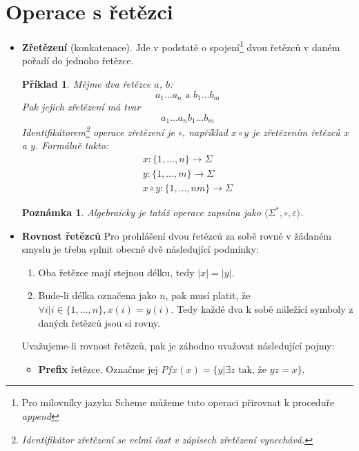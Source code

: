 \documentclass[10pt, a4paper, titlepage]{article}
\theoremstyle{note}
\newtheorem{priklad}{\textbf{Příklad}}
\newtheorem{poznamka}{\textbf{Poznámka}}
\begin{document}
\section{Operace s řetězci}
\begin{itemize}
\item
\textbf{Zřetězení} (konkatenace). Jde v podstatě o spojení\footnote{Pro milovníky jazyka Scheme můžeme tuto operaci přirovnat k proceduře \emph{append}}
dvou řetězců v daném pořadí do jednoho řetězce.

\begin{priklad}
Mějme dva řetězce $a$, $b$:
$$
a_{1}\ldots a_{n} \text{ a } b_{1}\ldots b_{m}
$$
Pak jejich zřetězení má tvar
$$
a_{1}\ldots a_{n}b_{1}\ldots b_{m}
$$
Identifikátorem\footnote{Identifikátor zřetězení se velmi čast v zápisech zřetězení vynechává.} operace
zřetězení je $\circ$, například $x\circ y$ je zřetězením řetězců $x$ a $y$.
Formálně takto:
\begin{gather*}
x : \lbrace 1,\ldots, n \rbrace \rightarrow \Sigma \\
y : \lbrace 1,\ldots, m \rbrace \rightarrow \Sigma \\
x \circ y : \lbrace 1,\ldots, nm \rbrace \rightarrow \Sigma
\end{gather*}
\end{priklad}

\begin{poznamka}
Algebraicky je tatáž operace zapsána jako $\langle \Sigma^{*}, \circ, \varepsilon \rangle$.
\end{poznamka}

\item
\textbf{Rovnost řetězců}
Pro prohlášení dvou řetězců za sobě rovné v žádaném smyslu je třeba splnit obecně dvě následující podmínky:
\begin{enumerate}
\item
Oba řetězce mají stejnou délku, tedy $|x| = |y|$.

\item
Bude-li délka označena jako $n$, pak musí platit, že $\forall i | i \in \lbrace 1, \ldots, n \rbrace, x(i) = y(i)$.
Tedy každé dva k sobě náležící symboly z daných řetězců jsou si rovny.
\end{enumerate}
Uvažujeme-li rovnost řetězců, pak je záhodno uvažovat následující pojmy:
\begin{itemize}
\item
\textbf{Prefix} řetězce. Označme jej $Pfx(x) = \lbrace y | \exists z \text{ tak, že } yz = x \rbrace$.


\end{itemize}
\end{itemize}
\end{document}
